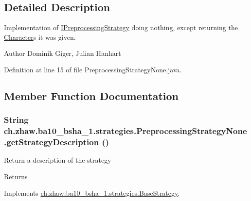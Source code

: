 \subsection{Detailed Description}
Implementation of \hyperlink{interfacech_1_1zhaw_1_1ba10__bsha__1_1_1strategies_1_1IPreprocessingStrategy}{IPreprocessingStrategy} doing nothing, except returning the \hyperlink{classch_1_1zhaw_1_1ba10__bsha__1_1_1Character}{Character}s it was given.

\begin{DoxyAuthor}{Author}
Dominik Giger, Julian Hanhart 
\end{DoxyAuthor}


Definition at line 15 of file PreprocessingStrategyNone.java.

\subsection{Member Function Documentation}
\hypertarget{classch_1_1zhaw_1_1ba10__bsha__1_1_1strategies_1_1PreprocessingStrategyNone_aa9acb726892bd3fb6641de865c60cfed}{
\subsubsection[{getStrategyDescription}]{\setlength{\rightskip}{0pt plus 5cm}String ch.zhaw.ba10\_\-bsha\_\-1.strategies.PreprocessingStrategyNone.getStrategyDescription ()}}
\label{classch_1_1zhaw_1_1ba10__bsha__1_1_1strategies_1_1PreprocessingStrategyNone_aa9acb726892bd3fb6641de865c60cfed}
Return a description of the strategy

\begin{DoxyReturn}{Returns}

\end{DoxyReturn}


Implements \hyperlink{classch_1_1zhaw_1_1ba10__bsha__1_1_1strategies_1_1BaseStrategy_a75fdb36932ad701f6375cc1fe718056b}{ch.zhaw.ba10\_\-bsha\_\-1.strategies.BaseStrategy}.

